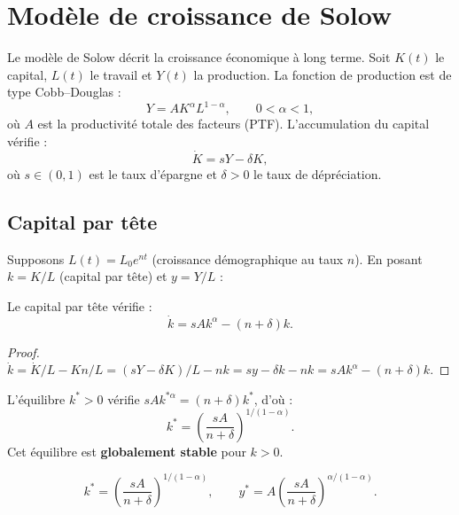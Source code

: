 \section{Mod\`ele de croissance de Solow}
\label{sec:solow}

\begin{definition}
Le mod\`ele de Solow d\'ecrit la croissance \'economique \`a long
terme.  Soit $K(t)$ le capital, $L(t)$ le travail et $Y(t)$ la
production.  La fonction de production est de type Cobb--Douglas :
\[
  Y = AK^\alpha L^{1-\alpha}, \qquad 0<\alpha<1,
\]
o\`u $A$ est la productivit\'e totale des facteurs (PTF).
L'accumulation du capital v\'erifie :
\[
  \dot{K} = sY - \delta K,
\]
o\`u $s\in(0,1)$ est le taux d'\'epargne et $\delta>0$ le taux de
d\'epr\'eciation.
\end{definition}

\subsection{Capital par t\^ete}

Supposons $L(t)=L_0 e^{nt}$ (croissance d\'emographique au taux $n$).
En posant $k=K/L$ (capital par t\^ete) et $y=Y/L$ :

\begin{theoreme}
Le capital par t\^ete v\'erifie :
\[
  \dot{k} = sAk^\alpha - (n+\delta)k.
\]
\end{theoreme}

\begin{proof}
$\dot{k} = \dot{K}/L - Kn/L = (sY-\delta K)/L - nk
= sy - \delta k - nk = sAk^\alpha - (n+\delta)k$.
\end{proof}

\begin{proposition}
L'\'equilibre $k^* > 0$ v\'erifie $sAk^{*\alpha} = (n+\delta)k^*$,
d'o\`u :
\[
  k^* = \left(\frac{sA}{n+\delta}\right)^{1/(1-\alpha)}.
\]
Cet \'equilibre est \textbf{globalement stable} pour $k>0$.
\end{proposition}

\begin{formules}[title=\textbf{\'Equilibre de Solow}]
\[
  k^* = \left(\frac{sA}{n+\delta}\right)^{1/(1-\alpha)}, \qquad
  y^* = A\left(\frac{sA}{n+\delta}\right)^{\alpha/(1-\alpha)}.
\]
\end{formules}

